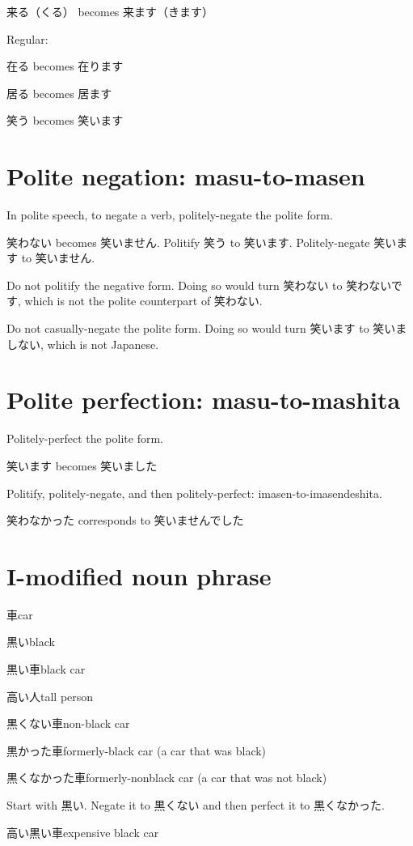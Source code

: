 来る（くる） becomes 来ます（きます）

Regular:

在る becomes 在ります

居る becomes 居ます

笑う becomes 笑います

\section{Polite negation: masu-to-masen}

In polite speech, to negate a verb,
politely-negate the polite form.

笑わない becomes 笑いません.
Politify 笑う to 笑います.
Politely-negate 笑います to 笑いません.

Do not politify the negative form.
Doing so would turn 笑わない to 笑わないです,
which is not the polite counterpart of 笑わない.

Do not casually-negate the polite form.
Doing so would turn 笑います to 笑いましない,
which is not Japanese.

\section{Polite perfection: masu-to-mashita}

Politely-perfect the polite form.

笑います becomes 笑いました

Politify, politely-negate, and then politely-perfect: imasen-to-imasendeshita.

笑わなかった corresponds to 笑いませんでした

\section{I-modified noun phrase}

車car

黒いblack

黒い車black car

高い人tall person

黒くない車non-black car

黒かった車formerly-black car (a car that was black)

黒くなかった車formerly-nonblack car (a car that was not black)

Start with 黒い. Negate it to 黒くない
and then perfect it to 黒くなかった.

高い黒い車expensive black car

